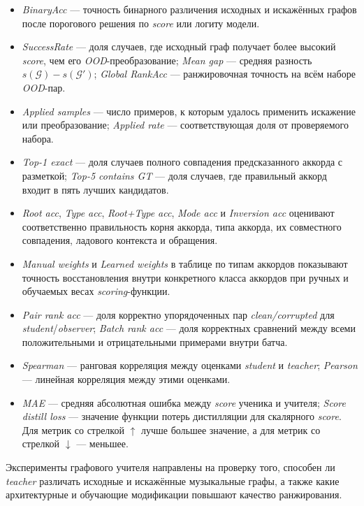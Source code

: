 \documentclass[a4paper,12pt]{extarticle}
\begin{document}
\begin{itemize}
\item \textit{BinaryAcc} --- точность бинарного различения исходных и искажённых графов после порогового решения по \textit{score} или логиту модели.
\item \textit{SuccessRate} --- доля случаев, где исходный граф получает более высокий \textit{score}, чем его \textit{OOD}-преобразование; \textit{Mean gap} --- средняя разность $s(\mathcal{G})-s(\mathcal{G}')$; \textit{Global RankAcc} --- ранжировочная точность на всём наборе \textit{OOD}-пар.
\item \textit{Applied samples} --- число примеров, к которым удалось применить искажение или преобразование; \textit{Applied rate} --- соответствующая доля от проверяемого набора.
\item \textit{Top-1 exact} --- доля случаев полного совпадения предсказанного аккорда с разметкой; \textit{Top-5 contains GT} --- доля случаев, где правильный аккорд входит в пять лучших кандидатов.
\item \textit{Root acc}, \textit{Type acc}, \textit{Root+Type acc}, \textit{Mode acc} и \textit{Inversion acc} оценивают соответственно правильность корня аккорда, типа аккорда, их совместного совпадения, ладового контекста и обращения.
\item \textit{Manual weights} и \textit{Learned weights} в таблице по типам аккордов показывают точность восстановления внутри конкретного класса аккордов при ручных и обучаемых весах \textit{scoring}-функции.
\item \textit{Pair rank acc} --- доля корректно упорядоченных пар \textit{clean/corrupted} для \textit{student}/\textit{observer}; \textit{Batch rank acc} --- доля корректных сравнений между всеми положительными и отрицательными примерами внутри батча.
\item \textit{Spearman} --- ранговая корреляция между оценками \textit{student} и \textit{teacher}; \textit{Pearson} --- линейная корреляция между этими оценками.
\item \textit{MAE} --- средняя абсолютная ошибка между \textit{score} ученика и учителя; \textit{Score distill loss} --- значение функции потерь дистилляции для скалярного \textit{score}. Для метрик со стрелкой $\uparrow$ лучше большее значение, а для метрик со стрелкой $\downarrow$ --- меньшее.
\end{itemize}

Эксперименты графового учителя направлены на проверку того, способен ли \textit{teacher} различать исходные и искажённые музыкальные графы, а также какие архитектурные и обучающие модификации повышают качество ранжирования.
\end{document}
